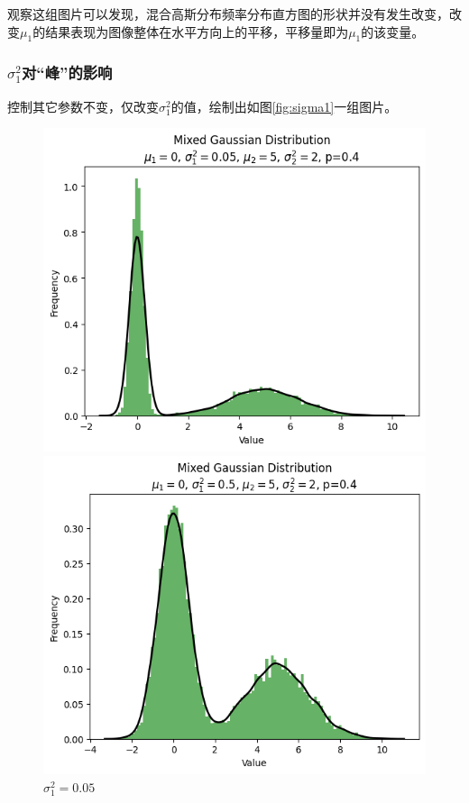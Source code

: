 \documentclass{article}
\begin{document}
观察这组图片可以发现，混合高斯分布频率分布直方图的形状并没有发生改变，改变$\mu_1$的结果表现为图像整体在水平方向上的平移，平移量即为$\mu_1$的该变量。\label{sec:mu1}

\subsubsection{\texorpdfstring{$\sigma_1^2$对“峰”的影响}{sigma1平方对“峰”的影响}}

控制其它参数不变，仅改变$\sigma_1^2$的值，绘制出如图\ref{fig:sigma1}一组图片。

\begin{figure}[H]
    \centering
    \begin{minipage}[b]{0.3\linewidth}
        \centering
        \includegraphics[width=\linewidth]{figure/sigma_1^2=0.05.png}
        \caption{$\sigma_1^2=0.05$}
    \end{minipage}
    \hfill
    \begin{minipage}[b]{0.3\linewidth}
        \centering
        \includegraphics[width=\linewidth]{figure/sigma_1^2=0.5.png}

\end{minipage}
\end{figure}
\end{document}
